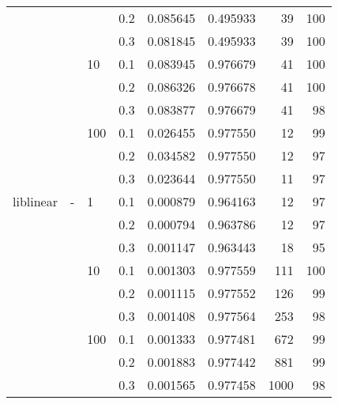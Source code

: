 \begin{table}[H]
\begin{tabular}{llllrrrr}
          &   &     & 0.2 &  0.085645 &  0.495933 &      39 &   100 \\
          &   &     & 0.3 &  0.081845 &  0.495933 &      39 &   100 \\
          &   & 10  & 0.1 &  0.083945 &  0.976679 &      41 &   100 \\
          &   &     & 0.2 &  0.086326 &  0.976678 &      41 &   100 \\
          &   &     & 0.3 &  0.083877 &  0.976679 &      41 &    98 \\
          &   & 100 & 0.1 &  0.026455 &  0.977550 &      12 &    99 \\
          &   &     & 0.2 &  0.034582 &  0.977550 &      12 &    97 \\
          &   &     & 0.3 &  0.023644 &  0.977550 &      11 &    97 \\
liblinear & - & 1   & 0.1 &  0.000879 &  0.964163 &      12 &    97 \\
          &   &     & 0.2 &  0.000794 &  0.963786 &      12 &    97 \\
          &   &     & 0.3 &  0.001147 &  0.963443 &      18 &    95 \\
          &   & 10  & 0.1 &  0.001303 &  0.977559 &     111 &   100 \\
          &   &     & 0.2 &  0.001115 &  0.977552 &     126 &    99 \\
          &   &     & 0.3 &  0.001408 &  0.977564 &     253 &    98 \\
          &   & 100 & 0.1 &  0.001333 &  0.977481 &     672 &    99 \\
          &   &     & 0.2 &  0.001883 &  0.977442 &     881 &    99 \\
          &   &     & 0.3 &  0.001565 &  0.977458 &    1000 &    98 \\
\bottomrule
\end{tabular}
\end{table}
